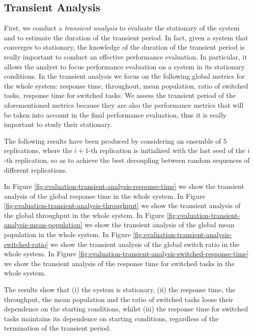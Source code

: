\subsection{Transient Analysis}
\label{sec:evaluation-transient-analysis}
First, we conduct a \textit{transient analysis} to evaluate the stationary of the system and to estimate the duration of the transient period.
%
In fact, given a system that converges to stationary, the knowledge of the duration of the transient period is really important to conduct an effective performance evaluation. In particular, it allows the analyst to focus performance evaluation on a system in its stationary conditions.
%
In the transient analysis we focus on the following global metrics for the whole system: response time, throughout, mean population, ratio of switched tasks, response time for switched tasks. 
%
We assess the transient period of the aforementioned metrics because they are also the performance metrics that will be taken into account in the final performance evaluation, thus it is really important to study their stationary.

The following results have been produced by considering an ensemble of $5$ replications, where the $i+1$-th replication is initialized with the last seed of the $i$-th replication, so as to achieve the best decoupling between random sequences of different replications.

In Figure \ref{fig:evaluation-transient-analysis-response-time} we show the transient analysis of the global response time in the whole system.
%
In Figure \ref{fig:evaluation-transient-analysis-throughput} we show the transient analysis of the global throughput in the whole system.
%
In Figure \ref{fig:evaluation-transient-analysis-mean-population} we show the transient analysis of the global mean population in the whole system.
%
In Figure \ref{fig:evaluation-transient-analysis-switched-ratio} we show the transient analysis of the global switch ratio in the whole system.
%
In Figure \ref{fig:evaluation-transient-analysis-switched-response-time} we show the transient analysis of the response time for switched tasks in the whole system.

The results show that 
(i) the system is stationary,
(ii) the response time, the throughput, the mean population and the ratio of switched tasks loose their dependence on the starting conditions, whilst 
(iii) the response time for switched tasks maintains its dependence on starting conditions, regardless of the termination of the transient period.

